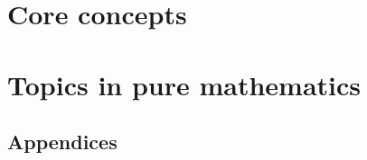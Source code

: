 \documentclass[10pt]{book}
\begin{document}
% 

\frontmatter


\restoregeometry

\clearpage


\tableofcontents

\mainmatter

\setcounter{chapter}{-1}



\part{Core concepts}
\label{ptCoreConcepts}








\part{Topics in pure mathematics}
\label{ptTopics}









\appendix

\begin{appendices}

\renewcommand{\sectionmark}[1]{\markboth{\leftmark}{Section \thesection.\ #1}}
\renewcommand{\chaptermark}[1]{\markboth{Appendix \thechapter.\ #1}{\rightmark}}

\part*{Appendices}




\end{appendices}

\backmatter



\cleardoublepage
\end{document}
